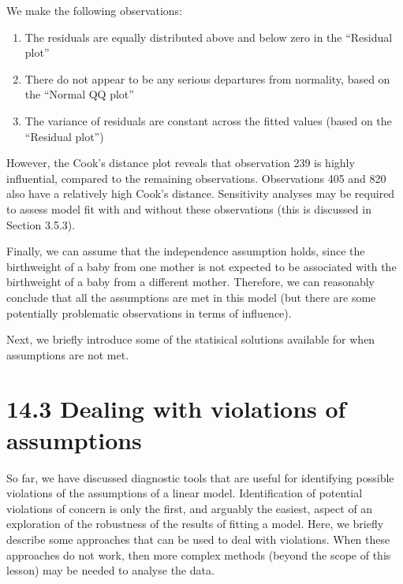 \documentclass[letterpaper,10pt,english]{jupyterBook}
\begin{document}
\noindent{}

\sphinxAtStartPar
We make the following observations:
\begin{enumerate}
%
\item {} 
\sphinxAtStartPar
{} The residuals are equally distributed above and below zero in the “Residual plot”

\item {} 
\sphinxAtStartPar
{} There do not appear to be any serious departures from normality, based on the “Normal Q\sphinxhyphen{}Q plot”

\item {} 
\sphinxAtStartPar
{} The variance of residuals are constant across the fitted values (based on the “Residual plot”)

\end{enumerate}

\sphinxAtStartPar
However, the Cook’s distance plot reveals that observation 239 is highly influential, compared to the remaining observations. Observations 405 and 820 also have a relatively high Cook’s distance. Sensitivity analyses may be required to assess model fit with and without these observations (this is discussed in Section 3.5.3).

\sphinxAtStartPar
Finally, we can assume that the independence assumption holds, since the birthweight of a baby from one mother is not expected to be associated with the birthweight of a baby from a different mother. Therefore, we can reasonably conclude that all the assumptions are met in this model (but there are some potentially problematic observations in terms of influence).

\sphinxAtStartPar
Next, we briefly introduce some of the statisical solutions available for when assumptions are not met.


\section{14.3 Dealing with violations of assumptions}
\label{\detokenize{14.e. Linear Regression III:dealing-with-violations-of-assumptions}}\label{\detokenize{14.e. Linear Regression III::doc}}
\sphinxAtStartPar
So far, we have discussed diagnostic tools that are useful for identifying possible violations of the assumptions of a linear model. Identification of potential violations of concern is only the first, and arguably the easiest, aspect of an exploration of the robustness of the results of fitting a model. Here, we briefly describe some approaches that can be used to deal with violations. When these approaches do not work, then more complex methods (beyond the scope of this lesson) may be needed to analyse the data.
\end{document}
